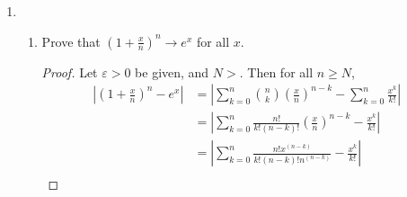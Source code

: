 \documentclass{article}
\begin{document}
\begin{enumerate}
\begin{proof}
                  \begin{align*}
                        \lvert f_n(x)-f(x)\rvert & = \left\lvert\frac{n(0)}{1+n^2(0)^2}-0\right\rvert \\
                                                 & = \left\lvert\frac{0}{1}\right\rvert               \\
                                                 & = \lvert0\rvert=0\leq\varepsilon
                  \end{align*}
                  and the following if $x\neq 0\implies x>0$:
                  \begin{align*}
                        \lvert f_n(x)-f(x)\rvert & = \left\lvert\frac{nx}{1+n^2x^2}-0\right\rvert \\
                                                 & < \frac{nx}{n^2x^2} = \frac{1}{nx}             \\
                                                 & < \frac{1}{Nx}                                 \\
                                                 & < \varepsilon
                  \end{align*}
                  Therefore, $f_n(x)$ converges pointwise. However, given any
                  $\varepsilon>0$, there exists some $x$ such that
                  $\frac{1}{Nx}\geq\varepsilon$. Therefore, $f_n(x)$ does not
                  converge uniformly.
            \end{proof}
            \setcounter{enumi}{13}
      \item \begin{enumerate}
                  \item Prove that $(1+\frac{x}{n})^n\to e^x$
                        for all $x$.
                        \begin{proof}
                              Let $\varepsilon>0$ be given, and $N>$. Then for all $n\geq N$,
                              \begin{align*}
                                    \left\lvert(1+\frac{x}{n})^n-e^x\right\rvert & = \left\lvert\sum_{k=0}^n\binom{n}{k}\left(\frac{x}{n}\right)^{n-k} - \sum_{k=0}^n\frac{x^k}{k!}\right\rvert \\
                                                                                 & = \left\lvert\sum_{k=0}^n\frac{n!}{k!(n-k)!}\left(\frac{x}{n}\right)^{n-k} - \frac{x^k}{k!}\right\rvert      \\
                                                                                 & = \left\lvert\sum_{k=0}^n\frac{n!x^{(n-k)}}{k!(n-k)!n^{(n-k)}} - \frac{x^k}{k!}\right\rvert                  \\

\end{align*}
\end{proof}
\end{enumerate}
\end{enumerate}
\end{document}
